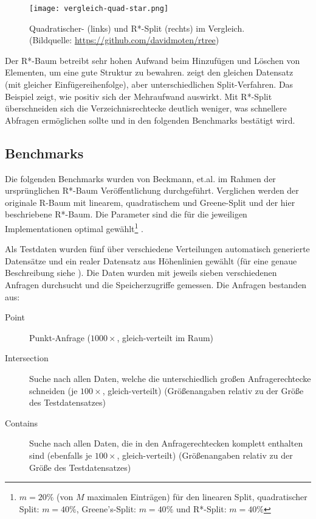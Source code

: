 \documentclass[runningheads,a4paper]{llncs}
\begin{document}
	\begin{figure}[H]
		\centering
		\texttt{[image: vergleich-quad-star.png]}
		\caption{Quadratischer- (links) und R*-Split (rechts) im Vergleich. (Bildquelle: \url{https://github.com/davidmoten/rtree})}
		\label{fig:vergleich-quad-star}
	\end{figure}

	Der R*-Baum betreibt sehr hohen Aufwand beim Hinzufügen und Löschen von Elementen, um eine gute Struktur zu bewahren.  zeigt den gleichen Datensatz (mit gleicher Einfügereihenfolge), aber unterschiedlichen Split-Verfahren. Das Beispiel zeigt, wie positiv sich der Mehraufwand auswirkt. Mit R*-Split überschneiden sich die Verzeichnisrechtecke deutlich weniger, was schnellere Abfragen ermöglichen sollte und in den folgenden Benchmarks bestätigt wird.

	\subsection{Benchmarks} %
	\label{sub:benchmarks}

	Die folgenden Benchmarks wurden von Beckmann, et.al. im Rahmen der ursprünglichen R*-Baum Veröffentlichung durchgeführt. Verglichen werden der originale R-Baum mit linearem, quadratischem und Greene-Split und der hier beschriebene R*-Baum. Die Parameter sind die für die jeweiligen Implementationen optimal gewählt\footnote{$m=20\%$ (von $M$ maximalen Einträgen) für den linearen Split, quadratischer Split: $m=40\%$, Greene's-Split: $m=40\%$ und R*-Split: $m=40\%$} \citep[vgl.][328]{Beckmann:1990}.

	Als Testdaten wurden fünf über verschiedene Verteilungen automatisch generierte Datensätze und ein realer Datensatz aus Höhenlinien gewählt (für eine genaue Beschreibung siehe \cite[328]{Beckmann:1990}). Die Daten wurden mit jeweils sieben verschiedenen Anfragen durchsucht und die Speicherzugriffe gemessen. Die Anfragen bestanden aus:
	\begin{description}
		\item[Point] Punkt-Anfrage ($1000\times$, gleich-verteilt im Raum)
		\item[Intersection] Suche nach allen Daten, welche die unterschiedlich großen Anfragerechtecke schneiden (je $100\times$, gleich-verteilt) (Größenangaben relativ zu der Größe des Testdatensatzes)
		\item[Contains] Suche nach allen Daten, die in den Anfragerechtecken komplett enthalten sind (ebenfalls je $100\times$, gleich-verteilt) (Größenangaben relativ zu der Größe des Testdatensatzes)
	\end{description}
\end{document}
